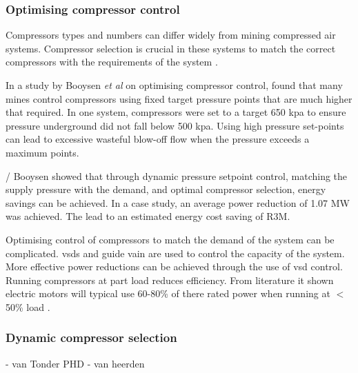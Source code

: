 		\subsubsection{Optimising compressor control}
		Compressors types and numbers can differ widely from mining compressed air systems. Compressor selection is crucial in these systems to match the correct compressors with the requirements of the system \cite{marais2010expert}.
		\par 
		In a study by Booysen \textit{et al} \cite{Booysen2012Masters} on optimising compressor control, \cite{Booysen2012Masters} found that many mines control compressors using fixed target pressure points that are much higher that required. In one system, compressors were set to a target 650 \gls{kpa} to ensure pressure underground did not fall below 500 \gls{kpa}. Using high pressure set-points can lead to excessive wasteful blow-off flow when the pressure exceeds a maximum points.
		\par/ 
		Booysen \cite{booysen2009optimising} showed that through dynamic pressure setpoint control, matching the supply pressure with the demand, and optimal compressor selection, energy savings can be achieved. In a case study, an average power reduction of 1.07 MW was achieved. The lead to an estimated energy cost saving of R3M.
		\par 
	 	Optimising control of compressors to match the demand of the system can be complicated. \glspl{vsd} and guide vain are used to control the capacity of the system. More effective power reductions can be achieved through the use of \gls{vsd} control. Running compressors at part load reduces efficiency. From literature it shown electric motors will typical use 60-80\% of there rated power when running at $<$50\% load \cite{Saidur2010}.
		
		\subsubsection{Dynamic compressor selection}
		- van Tonder PHD
		- van heerden 
		
